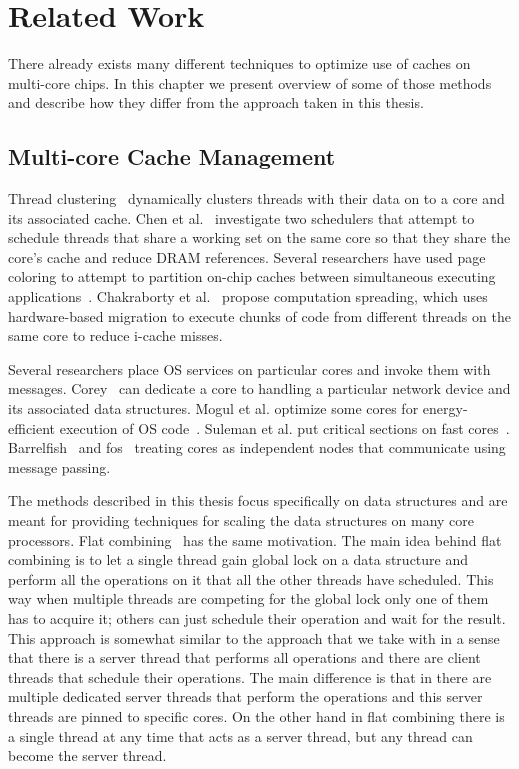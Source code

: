\section{Related Work}

There already exists many different techniques to optimize use of caches on multi-core chips.
In this chapter we present overview of some of those methods and describe how they differ from the approach
taken in this thesis.

\subsection{Multi-core Cache Management}

Thread clustering~\cite{tam:threadclustering} dynamically clusters
threads with their data on to a core and its associated cache. Chen et
al.~\cite{chen-07} investigate two schedulers that attempt to schedule
threads that share a working set on the same core so that they share
the core's cache and reduce DRAM references.  Several researchers have
used page coloring to attempt to partition on-chip caches between
simultaneous executing applications~\cite{cho:micro,tam:sharedl2,lin:partitionl2,soares:pollute,zhang:pagecolor}. 
Chakraborty et al.~\cite{koushik:csp} propose computation spreading, which uses
hardware-based migration to execute chunks of code from different
threads on the same core to reduce i-cache misses.

Several researchers place OS services on particular cores and invoke them with messages.
Corey~\cite{corey:osdi08} can dedicate a core to handling a particular network device and its
associated data structures.  Mogul et al. optimize some cores for energy-efficient execution of OS code~\cite{mogul:micro}.
Suleman et al. put critical sections on fast cores~\cite{suleman:acs}.
Barrelfish~\cite{barrelfish} and fos~\cite{wentzlaff:fos} treating cores as independent nodes that
communicate using message passing. 

The methods described in this thesis focus specifically on data structures and are meant for providing techniques for scaling the 
data structures on many core processors. Flat combining~\cite{flatcombining} has the same motivation. The main idea behind flat combining
is to let a single thread gain global lock on a data structure and perform all the operations on it that all the other threads
have scheduled. This way when multiple threads are competing for the global lock only one of them has to acquire it; others can just
schedule their operation and wait for the result. This approach is somewhat similar to the approach that we take with \cphash{} in a sense that 
there is a server thread that performs all operations and there are client threads that schedule their operations. The main difference is
that in \cphash{} there are multiple dedicated server threads that perform the operations and this server threads are pinned to specific cores.
On the other hand in flat combining there is a single thread at any time that acts as a server thread, but any thread can become the
server thread.

